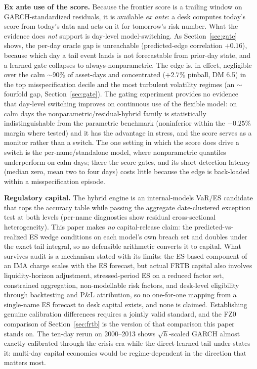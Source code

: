 \documentclass[11pt]{article}
\theoremstyle{remark}
\begin{document}
\medskip
\textbf{Ex ante use of the score.} Because the frontier score is a trailing window on
GARCH-standardized residuals, it is available \emph{ex ante}: a desk
computes today's score from today's data and acts on it for tomorrow's
risk number. What the evidence does \emph{not} support is day-level
model-switching. As Section~\ref{sec:gate} shows, the per-day oracle gap
is unreachable (predicted-edge correlation $+0.16$), because which day a
tail event lands is not forecastable from prior-day state, and a learned
gate collapses to always-nonparametric. The edge is, in effect,
negligible over the calm $\sim$90\% of asset-days and concentrated
($+2.7\%$ pinball, DM 6.5) in the top misspecification decile and the
most turbulent volatility regimes (an $\sim$fourfold gap,
Section~\ref{sec:gate}). The gating experiment provides no evidence
that day-level switching improves on continuous use of the flexible
model: on calm days the nonparametric/residual-hybrid family is
statistically indistinguishable from the parametric benchmark
(noninferior within the $-0.25\%$ margin where tested) and it has the
advantage in stress, and the score serves as a monitor rather than a
switch. The
one setting in which the score does drive a switch is the
per-name/standalone model, where nonparametric quantiles underperform on
calm days; there the score gates, and its short detection latency
(median zero, mean two to four days) costs little because the edge is
back-loaded within a misspecification episode.

\textbf{Regulatory capital.} The
hybrid engine is an internal-models VaR/ES candidate that tops the
accuracy table while passing the aggregate date-clustered exception
test at both levels (per-name diagnostics show residual
cross-sectional heterogeneity). This paper makes \emph{no}
capital-release claim: the predicted-vs-realized ES wedge conditions
on each model's own breach set and doubles under the exact tail
integral, so no defensible arithmetic converts it to capital. What survives
audit is a mechanism stated with its limits: the ES-based component
of an IMA charge scales with the ES forecast, but actual FRTB capital
also involves liquidity-horizon adjustment, stressed-period ES on a
reduced factor set, constrained aggregation, non-modellable risk
factors, and desk-level eligibility through backtesting and P\&L attribution, so no one-for-one mapping from a single-name ES
forecast to desk capital exists, and none is claimed. Establishing
genuine calibration differences requires a jointly valid standard,
and the FZ0 comparison of Section~\ref{sec:frtb} is the version of
that comparison this paper stands on. The ten-day rerun on
2000--2013 shows $\sqrt{h}$-scaled GARCH almost exactly calibrated
through the crisis era while the direct-learned tail under-states it:
multi-day capital economics would be regime-dependent in the direction
that matters most.
\end{document}
